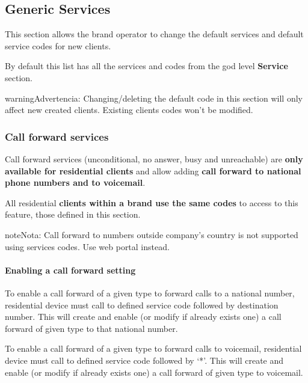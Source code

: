 \documentclass[letterpaper,10pt,spanish]{sphinxmanual}
\begin{document}
\subsection{Generic Services}
\label{administration_portal/brand/settings/generic_services:generic-services}\label{administration_portal/brand/settings/generic_services::doc}\label{administration_portal/brand/settings/generic_services:brand-services}
This section allows the brand operator to change the default services and default service codes for new clients.

By default this list has all the services and codes from the god level \textbf{Service} section.

\begin{notice}{warning}{Advertencia:}
Changing/deleting the default code in this section will only affect new created clients. Existing clients codes won't
be modified.
\end{notice}


\subsubsection{Call forward services}
\label{administration_portal/brand/settings/generic_services:call-forward-services}\label{administration_portal/brand/settings/generic_services:id1}
Call forward services (unconditional, no answer, busy and unreachable) are \textbf{only available for residential clients}
and allow adding \textbf{call forward to national phone numbers and to voicemail}.

All residential \textbf{clients within a brand use the same codes} to access to this feature, those defined in this section.

\begin{notice}{note}{Nota:}
Call forward to numbers outside company's country is not supported using services codes.
Use web portal instead.
\end{notice}
\paragraph{Enabling a call forward setting}

To enable a call forward of a given type to forward calls to a national number, residential device must call to defined
service code followed by destination number. This will create and enable (or modify if already exists one) a call
forward of given type to that national number.

To enable a call forward of a given type to forward calls to voicemail, residential device must call to defined
service code followed by `*'. This will create and enable (or modify if already exists one) a call
forward of given type to voicemail.
\end{document}
